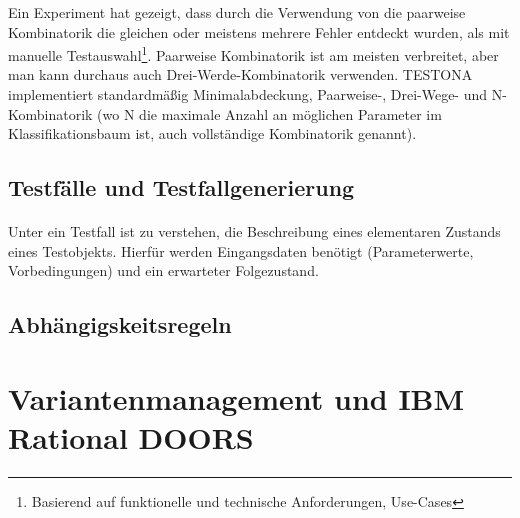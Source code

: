 Ein Experiment hat gezeigt, dass durch die Verwendung von die paarweise Kombinatorik die gleichen oder meistens mehrere Fehler entdeckt wurden, als mit manuelle Testauswahl\footnote{Basierend auf funktionelle und technische Anforderungen, Use-Cases}. Paarweise Kombinatorik ist am meisten verbreitet, aber man kann durchaus auch Drei-Werde-Kombinatorik verwenden. TESTONA implementiert standardmäßig Minimalabdeckung, Paarweise-, Drei-Wege- und N-Kombinatorik (wo N die maximale Anzahl an möglichen Parameter im Klassifikationsbaum ist, auch vollständige Kombinatorik genannt)\cite{CombinatorialSTesting}.\\




\subsection{Testfälle und Testfallgenerierung}
\paragraph{}

Unter ein Testfall ist zu verstehen, die Beschreibung eines elementaren Zustands eines Testobjekts. Hierfür werden Eingangsdaten benötigt (Parameterwerte, Vorbedingungen) und ein erwarteter Folgezustand.

\subsection{Abhängigskeitsregeln}
\paragraph{}





\section{Variantenmanagement und IBM Rational DOORS}\label{DOORS}
\paragraph{}





